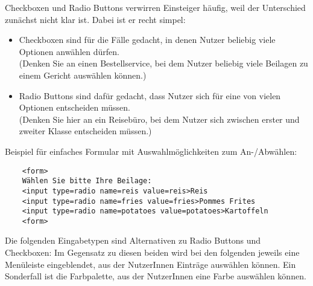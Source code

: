 Checkboxen und Radio Buttons verwirren Einsteiger häufig, weil der Unterschied zunächst nicht klar ist. Dabei ist er recht simpel: \\

\begin{itemize}
	\item Checkboxen sind für die Fälle gedacht, in denen Nutzer beliebig viele Optionen anwählen dürfen.\\
	(Denken Sie an einen Bestellservice, bei dem Nutzer beliebig viele Beilagen zu einem Gericht auswählen können.)
	\item Radio Buttons sind dafür gedacht, dass Nutzer sich für eine von vielen Optionen entscheiden müssen.\\
	(Denken Sie hier an ein Reisebüro, bei dem Nutzer sich zwischen erster und zweiter Klasse entscheiden müssen.)
\end{itemize}

Beispiel für einfaches Formular mit Auswahlmöglichkeiten zum An-/Abwählen:

\begin{verbatim}
	<form>
	Wählen Sie bitte Ihre Beilage:
	<input type=radio name=reis value=reis>Reis
	<input type=radio name=fries value=fries>Pommes Frites
	<input type=radio name=potatoes value=potatoes>Kartoffeln
	<form>
\end{verbatim}

Die folgenden Eingabetypen sind Alternativen zu Radio Buttons und Checkboxen: Im Gegensatz zu diesen beiden wird bei den folgenden jeweils eine Menüleiste eingeblendet, aus der NutzerInnen Einträge auswählen können. Ein Sonderfall ist die Farbpalette, aus der NutzerInnen eine Farbe auswählen können.

